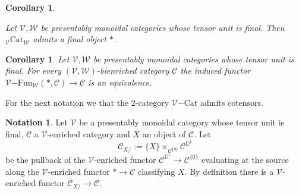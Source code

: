 \documentclass[10pt,oneside]{article}
\numberwithin{equation}{section} %
\numberwithin{figure}{section} %
\theoremstyle{plain}
\newtheorem{corollary}[theorem]{Corollary}
\theoremstyle{definition}
\newtheorem{notation}[theorem]{Notation}
\newcommand{\bD}{{\mathbb D}}
\newcommand{\mC}{{\mathcal C}}
\newcommand{\mP}{{\mathcal P}}
\newcommand{\mV}{{\mathcal V}}
\newcommand{\mW}{{\mathcal W}}
\newcommand{\X}{X}
\newcommand{\ot}{\otimes}
\newcommand{\Cat}{\mathrm{Cat}}
\newcommand{\Fun}{\mathrm{Fun}}
\newcommand{\Ind}{{\mathrm{Ind}}}
\begin{document}

\begin{corollary}\label{finality}
	
Let $\mV, \mW$ be presentably monoidal categories whose tensor unit is final.
Then ${_\mV \Cat_\mW}$ admits a final object $*$.
	
\end{corollary}

\begin{corollary}Let $\mV, \mW$ be presentably monoidal categories whose tensor unit is final.
For every $(\mV,\mW)$-bienriched category $\mC$
the induced functor ${\mV\mathrm{-}\Fun_\mW}(*,\mC) \to \mC$ is an equivalence.
    
\end{corollary}



For the next notation we that the 2-category $\mV\mathrm{-}\Cat$ admits cotensors.

\begin{notation}
Let $\mV$ be a presentably monoidal category whose tensor unit is final, $\mC$ a $\mV$-enriched category and $X $ an object of $\mC.$
Let $$ \mC_{\X/}:= \{X\} \times_{\mC^{\{0\}}} \mC^{\bD^1} $$ be the pullback of the $\mV$-enriched functor $\mC^{\bD^1} \to \mC^{\{0\}}$ evaluating at the source along the $\mV$-enriched functor $* \to \mC$ classifying $X$. 
By definition there is a $\mV$-enriched functor $\mC_{\X/}\to \mC$.
    
\end{notation}
\end{document}
